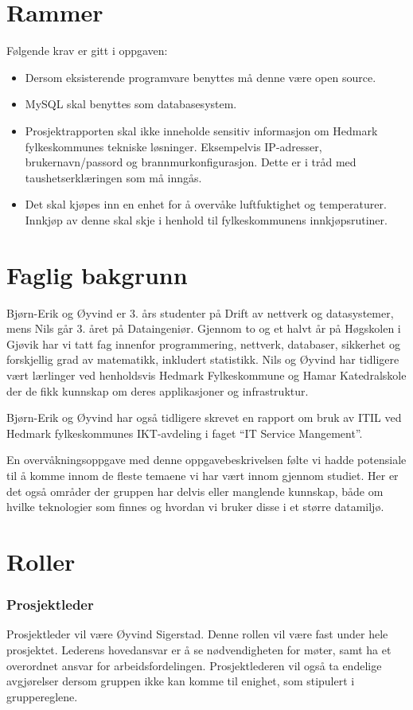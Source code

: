 \section{Rammer}
Følgende krav er gitt i oppgaven:
\begin{itemize}
	\item Dersom eksisterende programvare benyttes må denne være open source.
	\item MySQL skal benyttes som databasesystem.
	\item Prosjektrapporten skal ikke inneholde sensitiv informasjon om Hedmark fylkeskommunes tekniske løsninger. Eksempelvis IP-adresser, brukernavn/passord og brannmurkonfigurasjon. Dette er i tråd med taushetserklæringen som må inngås.
	\item Det skal kjøpes inn en enhet for å overvåke luftfuktighet og temperaturer. Innkjøp av denne skal skje i henhold til fylkeskommunens innkjøpsrutiner.
\end{itemize}

\section{Faglig bakgrunn}


Bjørn-Erik og Øyvind er 3. års studenter på Drift av nettverk og datasystemer, mens Nils går 3. året på Dataingeniør. Gjennom to og et halvt år på Høgskolen i Gjøvik har vi tatt fag innenfor programmering, nettverk, databaser, sikkerhet og forskjellig grad av matematikk, inkludert statistikk. Nils og Øyvind har tidligere vært lærlinger ved henholdsvis Hedmark Fylkeskommune og Hamar Katedralskole der de fikk kunnskap om deres applikasjoner og infrastruktur.

Bjørn-Erik og Øyvind har også tidligere skrevet en rapport om bruk av ITIL ved Hedmark fylkeskommunes IKT-avdeling i faget “IT Service Mangement”.

En overvåkningsoppgave med denne oppgavebeskrivelsen følte vi hadde potensiale til å komme innom de fleste temaene vi har vært innom gjennom studiet. Her er det også områder der gruppen har delvis eller manglende kunnskap, både om hvilke teknologier som finnes og hvordan vi bruker disse i et større datamiljø.

\section{Roller}
\subsubsection{Prosjektleder}
Prosjektleder vil være Øyvind Sigerstad. Denne rollen vil være fast under hele prosjektet. Lederens hovedansvar er å se nødvendigheten for møter, samt ha et overordnet ansvar for arbeidsfordelingen. Prosjektlederen vil også ta endelige avgjørelser dersom gruppen ikke kan komme til enighet, som stipulert i gruppereglene.

